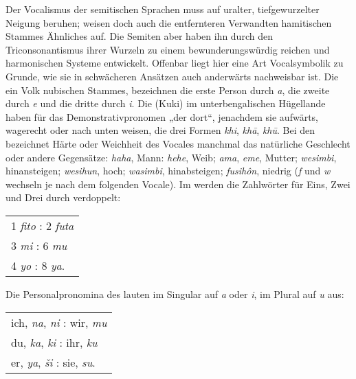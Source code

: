 Der Vocalismus der semitischen Sprachen muss auf uralter, tiefgewurzelter Neigung beruhen; weisen doch auch die entfernteren Verwandten hamitischen Stammes Ähnliches auf. Die Semiten aber haben ihn durch den Triconsonantismus ihrer Wurzeln zu einem bewunderungswürdig reichen und harmonischen Systeme entwickelt. Offenbar liegt hier eine Art Vocalsymbolik zu Grunde, wie sie in schwächeren Ansätzen auch anderwärts nachweisbar ist. Die  ein Volk nubischen Stammes, bezeichnen die erste Person durch \textit{a}, die zweite durch \textit{e} und die dritte durch \textit{i}. Die  (Kuki) im unterbengalischen Hügellande \label{fp.389} haben für das Demonstrativpronomen „der dort“, jenachdem sie aufwärts, wagerecht oder nach unten weisen, die drei Formen \textit{khi}, \textit{khā}, \textit{khū}. Bei den  bezeichnet Härte oder Weichheit des Vocales manchmal das natürliche Geschlecht oder andere Gegensätze: \textit{haha}, Mann: \textit{hehe}, Weib; \textit{ama},  \textit{eme}, Mutter; \textit{wesimbi}, hinansteigen; \textit{wesihun}, hoch; \textit{wasimbi}, hinabsteigen; \textit{fusihôn}, niedrig (\textit{f} und \textit{w} wechseln je nach dem folgenden Vocale). Im  werden die Zahlwörter für Eins, Zwei und Drei durch  verdoppelt:

\begin{center}
\begin{tabular}{l}
1 \textit{fito} : 2 \textit{futa} \\
3 \textit{mi} : 6 \textit{mu} \\
4 \textit{yo} : 8 \textit{ya}.
\end{tabular}
\end{center}

\noindent Die Personalpronomina des  lauten im Singular auf \textit{a} oder \textit{i}, im Plural auf \textit{u} aus:

\begin{center}
\begin{tabular}{l}
ich, \textit{na}, \textit{ni} : wir, \textit{mu} \\
du, \textit{ka}, \textit{ki} : ihr, \textit{ku} \\
er, \textit{ya}, \textit{ši} : sie, \textit{su}. 
\end{tabular}
\end{center}

